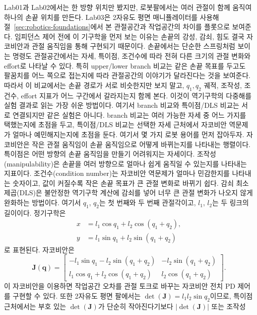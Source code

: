 Lab01과 Lab02에서는 한 방향 위치만 봤지만, 로봇팔에서는 여러 관절이 함께 움직여 하나의 손끝 위치를 만든다.
Lab03은 2자유도 평면 매니퓰레이터를 사용해 절~\ref{sec:robotics-foundations}에서 본 관절공간과 작업공간의 차이를 플롯으로 보여준다.
임피던스 제어 전에 이 기구학을 먼저 보는 이유는 손끝의 강성, 감쇠, 힘도 결국 자코비안과 관절 움직임을 통해 구현되기 때문이다.
손끝에서는 단순한 스프링처럼 보이는 명령도 관절공간에서는 자세, 특이점, 조건수에 따라 전혀 다른 크기의 관절 변화와 effort로 나타날 수 있다.
특히 upper/lower branch 비교는 같은 손끝 목표를 두고도 팔꿈치를 어느 쪽으로 접는지에 따라 관절공간의 이야기가 달라진다는 것을 보여준다.
따라서 이 비교에서는 손끝 경로가 서로 비슷한지만 보지 말고, \(q_1,q_2\) 궤적, 조작성, 조건수, effort 지표가 어느 구간에서 갈라지는지 함께 본다.
이것이 역기구학의 다중해를 실험 결과로 읽는 가장 쉬운 방법이다.
여기서 branch 비교와 특이점/DLS 비교는 서로 연결되지만 같은 실험은 아니다.
branch 비교는 여러 가능한 자세 중 어느 가지를 택했는지에 초점을 두고, 특이점/DLS 비교는 선택한 자세 근처에서 자코비안 역문제가 얼마나 예민해지는지에 초점을 둔다.
여기서 몇 가지 로봇 용어를 먼저 잡아두자.
자코비안은 작은 관절 움직임이 손끝 움직임으로 어떻게 바뀌는지를 나타내는 행렬이다.
특이점은 어떤 방향의 손끝 움직임을 만들기 어려워지는 자세이다.
조작성(manipulability)은 손끝을 여러 방향으로 얼마나 쉽게 움직일 수 있는지를 나타내는 지표이다.
조건수(condition number)는 자코비안 역문제가 얼마나 민감한지를 나타내는 숫자이고, 값이 커질수록 작은 손끝 목표가 큰 관절 변화로 바뀌기 쉽다.
감쇠 최소제곱(DLS)은 불안정한 역기구학 계산에 감쇠를 넣어 너무 큰 관절 변화가 나오지 않게 완화하는 방법이다.
여기서 $q_1$, $q_2$는 첫 번째와 두 번째 관절각이고, $l_1$, $l_2$는 두 링크의 길이이다.
정기구학은
\begin{align}
  x &= l_1 \cos q_1 + l_2 \cos(q_1 + q_2), \\
  y &= l_1 \sin q_1 + l_2 \sin(q_1 + q_2)
\end{align}
로 표현된다.
자코비안은
\begin{equation}
  \bm{J}(\bm{q}) =
  \begin{bmatrix}
  -l_1\sin q_1 - l_2\sin(q_1+q_2) & -l_2\sin(q_1+q_2) \\
   l_1\cos q_1 + l_2\cos(q_1+q_2) &  l_2\cos(q_1+q_2)
  \end{bmatrix}.
\end{equation}
이 자코비안을 이용하면 작업공간 오차를 관절 토크로 바꾸는 자코비안 전치 PD 제어를 구현할 수 있다.
또한 2자유도 평면 팔에서는 $\det(\bm{J})=l_1l_2\sin q_2$이므로, 특이점 근처에서는 부호 있는 $\det(\bm{J})$가 단순히 작아진다기보다 $|\det(\bm{J})|$ 또는 조작성
